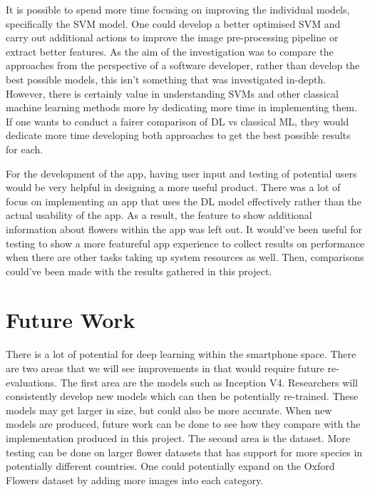 \documentclass[12pt,a4paper]{report}
\begin{document}
\par

It is possible to spend more time focusing on improving the individual models, specifically the SVM model. One could 
develop a better optimised SVM and carry out additional actions to improve the image pre-processing pipeline or extract 
better features. As the aim of the investigation was to compare the approaches from the perspective of a software 
developer, rather than develop the best possible models, this isn't something that was investigated in-depth. However, 
there is certainly value in understanding SVMs and other classical machine learning methods more by dedicating more time
in implementing them. If one wants to conduct a fairer comparison of DL vs classical ML, they would dedicate more time 
developing both approaches to get the best possible results for each. 

\par

For the development of the app, having user input and testing of potential users would be very helpful in designing a 
more useful product. There was a lot of focus on implementing an app that uses the DL model effectively rather than the 
actual usability of the app. As a result, the feature to show additional information about flowers within the app was 
left out. It would've been useful for testing to show a more featureful app experience to collect results on performance
when there are other tasks taking up system resources as well. Then, comparisons could've been made with the results 
gathered in this project. 

\section{Future Work}

There is a lot of potential for deep learning within the smartphone space. There are two areas that we will see 
improvements in that would require future re-evaluations. The first area are the models such as Inception V4. 
Researchers will consistently develop new models which can then be potentially re-trained. These models may get larger 
in size, but could also be more accurate. When new models are produced, future work can be done to see how they compare 
with the implementation produced in this project. The second area is the dataset. More testing can be done on larger 
flower datasets that has support for more species in potentially different countries. One could potentially expand on 
the Oxford Flowers dataset by adding more images into each category.
\end{document}
